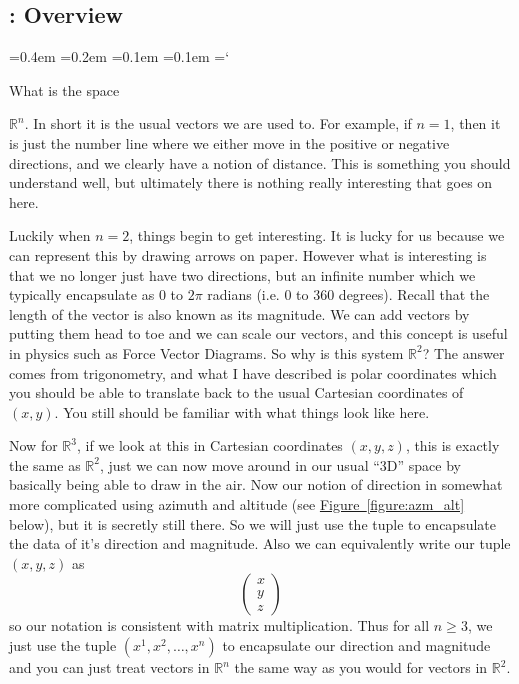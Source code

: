
\subsection{\vectorsInSpaceTitle: Overview}

{\ttfamily
{}\font=0.4em
\font=0.2em
\font=0.1em
\font=0.1em
\hyphenchar\font=`\-

\hypertarget{scripts_vectors_in_space_n_vectors_overview}{What is the space} $\mathbb{R}^n$. In short it is the usual vectors we are used to. For example, if $n = 1$, then it is just the number line where we either move in the positive or negative directions, and we clearly have a notion of distance. This is something you should understand well, but ultimately there is nothing really interesting that goes on here.

Luckily when $n = 2$, things begin to get interesting. It is lucky for us because we can represent this by drawing arrows on paper. However what is interesting is that we no longer just have two directions, but an infinite number which we typically encapsulate as $0$ to $2\pi$ radians (i.e. 0 to 360 degrees). Recall that the length of the vector is also known as its magnitude. We can add vectors by putting them head to toe and we can scale our vectors, and this concept is useful in physics such as Force Vector Diagrams. So why is this system $\mathbb{R}^2$? The answer comes from trigonometry, and what I have described is polar coordinates which you should be able to translate back to the usual Cartesian coordinates of $(x, y)$. You still should be familiar with what things look like here.

Now for $\mathbb{R}^3$, if we look at this in Cartesian coordinates $(x, y, z)$, this is exactly the same as $\mathbb{R}^2$, just we can now move around in our usual ``3D'' space by basically being able to draw in the air. Now our notion of direction in somewhat more complicated using azimuth and altitude (see \hyperref[figure:azm_alt]{Figure~\ref*{figure:azm_alt}} below), but it is secretly still there. So we will just use the tuple to encapsulate the data of it's direction and magnitude. Also we can equivalently write our tuple $(x,y,z)$ as
\[
\begin{pmatrix}x \\ y \\ z \end{pmatrix}
\]
so our notation is consistent with matrix multiplication. Thus for all $n \geq 3$, we just use the tuple $(x^1, x^2, \dotsc, x^n)$ to encapsulate our direction and magnitude and you can just treat vectors in $\mathbb{R}^n$ the same way as you would for vectors in $\mathbb{R}^2$.

}
